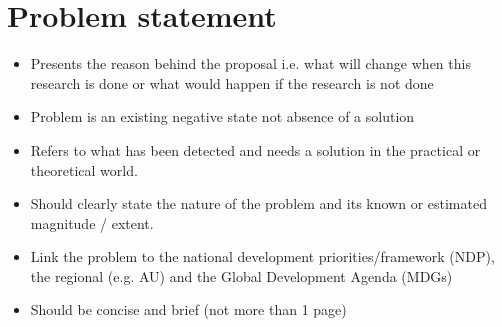 \section{Problem statement}

\begin{itemize}
\item Presents the reason behind the proposal i.e. what will change when this research is done or what would happen if the research is not done
\item Problem is an existing negative state not absence of a solution
\item Refers to what has been detected and needs a solution in the practical or theoretical world.
\item Should clearly state the nature of the problem and its known or estimated magnitude / extent.
\item Link the problem to the national development priorities/framework (NDP), the regional (e.g. AU) and the Global Development Agenda (MDGs)
\item Should be concise and brief (not more than 1 page)

\end{itemize}
